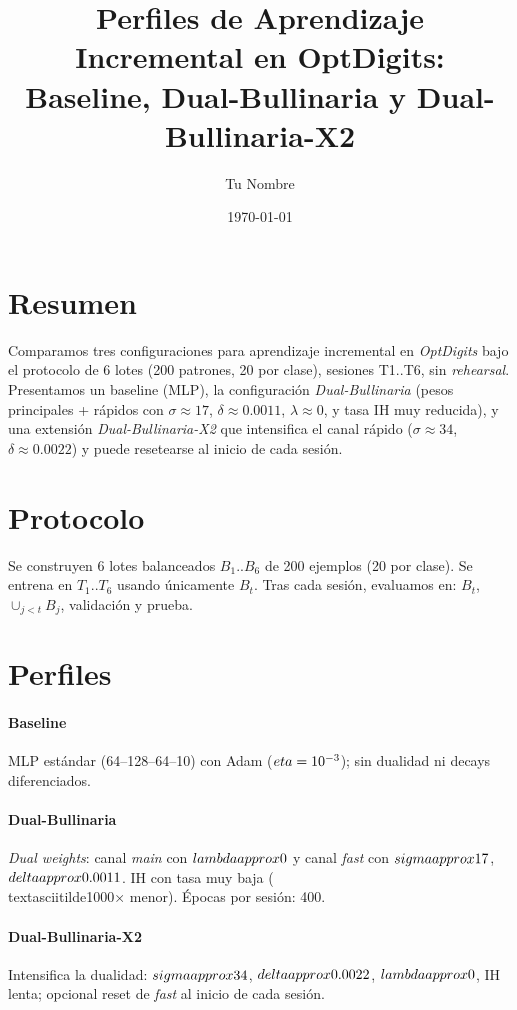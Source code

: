 \documentclass[11pt]{article}
\title{Perfiles de Aprendizaje Incremental en OptDigits: Baseline, Dual-Bullinaria y Dual-Bullinaria-X2}
\author{Tu Nombre}
\date{\today}
\begin{document}
\maketitle

\section*{Resumen}
Comparamos tres configuraciones para aprendizaje incremental en \emph{OptDigits} bajo el protocolo de 6 lotes (200 patrones, 20 por clase), sesiones T1..T6, sin \emph{rehearsal}. Presentamos un baseline (MLP), la configuración \emph{Dual-Bullinaria} (pesos principales + rápidos con $\sigma\approx 17$, $\delta\approx 0.0011$, $\lambda\approx 0$, y tasa IH muy reducida), y una extensión \emph{Dual-Bullinaria-X2} que intensifica el canal rápido ($\sigma\approx 34$, $\delta\approx 0.0022$) y puede resetearse al inicio de cada sesión.

\section{Protocolo}
Se construyen 6 lotes balanceados $B_1..B_6$ de 200 ejemplos (20 por clase). Se entrena en $T_1..T_6$ usando únicamente $B_t$. Tras cada sesión, evaluamos en: $B_t$, $\cup_{j<t} B_j$, validación y prueba.

\section{Perfiles}
\paragraph{Baseline} MLP estándar (64--128--64--10) con Adam ($\\eta=10^{-3}$); sin dualidad ni decays diferenciados.
\paragraph{Dual-Bullinaria} \emph{Dual weights}: canal \emph{main} con $\\lambda\\approx 0$ y canal \emph{fast} con $\\sigma\\approx 17$, $\\delta\\approx 0.0011$. IH con tasa muy baja (\\textasciitilde{}1000× menor). Épocas por sesión: 400.
\paragraph{Dual-Bullinaria-X2} Intensifica la dualidad: $\\sigma\\approx 34$, $\\delta\\approx 0.0022$, $\\lambda\\approx 0$, IH lenta; opcional reset de \emph{fast} al inicio de cada sesión.
\end{document}
